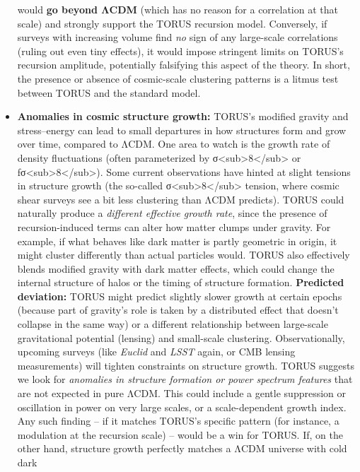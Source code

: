 \begin{itemize}
  would \textbf{go beyond ΛCDM} (which has no reason for a correlation
  at that scale) and strongly support the TORUS recursion model.
  Conversely, if surveys with increasing volume find \emph{no} sign of
  any large-scale correlations (ruling out even tiny effects), it would
  impose stringent limits on TORUS's recursion amplitude, potentially
  falsifying this aspect of the theory​. In short, the presence or
  absence of cosmic-scale clustering patterns is a litmus test between
  TORUS and the standard model.
\item
  \textbf{Anomalies in cosmic structure growth:} TORUS's modified
  gravity and stress--energy can lead to small departures in how
  structures form and grow over time, compared to ΛCDM. One area to
  watch is the growth rate of density fluctuations (often parameterized
  by σ\textless{}sub\textgreater{}8\textless{}/sub\textgreater{} or
  fσ\textless{}sub\textgreater{}8\textless{}/sub\textgreater{}). Some
  current observations have hinted at slight tensions in structure
  growth (the so-called
  σ\textless{}sub\textgreater{}8\textless{}/sub\textgreater{} tension,
  where cosmic shear surveys see a bit less clustering than ΛCDM
  predicts). TORUS could naturally produce a \emph{different effective
  growth rate}, since the presence of recursion-induced terms can alter
  how matter clumps under gravity. For example, if what behaves like
  dark matter is partly geometric in origin, it might cluster
  differently than actual particles would. TORUS also effectively blends
  modified gravity with dark matter effects, which could change the
  internal structure of halos or the timing of structure formation.
  \textbf{Predicted deviation:} TORUS might predict slightly slower
  growth at certain epochs (because part of gravity's role is taken by a
  distributed effect that doesn't collapse in the same way) or a
  different relationship between large-scale gravitational potential
  (lensing) and small-scale clustering. Observationally, upcoming
  surveys (like \emph{Euclid} and \emph{LSST} again, or CMB lensing
  measurements) will tighten constraints on structure growth. TORUS
  suggests we look for \emph{anomalies in structure formation or power
  spectrum features} that are not expected in pure ΛCDM​. This could
  include a gentle suppression or oscillation in power on very large
  scales, or a scale-dependent growth index. Any such finding -- if it
  matches TORUS's specific pattern (for instance, a modulation at the
  recursion scale) -- would be a win for TORUS. If, on the other hand,
  structure growth perfectly matches a ΛCDM universe with cold dark

\end{itemize}
